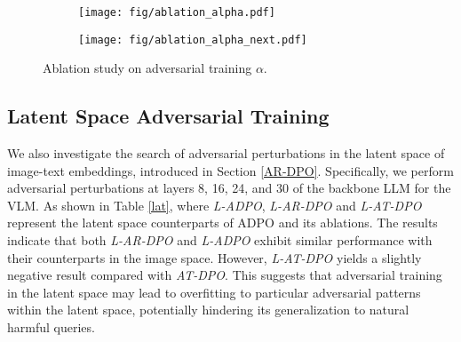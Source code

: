 \begin{figure}[ht]
\setlength{\abovecaptionskip}{0.cm}
    \centering
    \begin{subfigure}[b]{0.225\textwidth}
        \centering
        \texttt{[image: fig/ablation\_alpha.pdf]}
        \label{fig:sub1}
    \end{subfigure}
    \hfill
    \begin{subfigure}[b]{0.225\textwidth}
        \centering
        \texttt{[image: fig/ablation\_alpha\_next.pdf]}
        \label{fig:sub2}
    \end{subfigure}
\vspace{-1em}
    \caption{Ablation study on adversarial training $\alpha$.}
    \label{ablation study}
\vspace{-1em}
\end{figure}



\vspace{-.5em}
\subsection{Latent Space Adversarial Training}
\vspace{-.5em}

We also investigate the search of adversarial perturbations in the latent space of image-text embeddings, introduced in Section \ref{AR-DPO}. Specifically, we perform adversarial perturbations at layers 8, 16, 24, and 30 of the backbone LLM for the VLM.  As shown in Table \ref{lat}, where \textit{L-ADPO}, \textit{L-AR-DPO} and \textit{L-AT-DPO} represent the latent space counterparts of ADPO and its ablations. The results indicate that both \textit{L-AR-DPO} and \textit{L-ADPO} exhibit similar performance with their counterparts in the image space. However, \textit{L-AT-DPO} yields a slightly negative result compared with \textit{AT-DPO}. This suggests that adversarial training in the latent space may lead to overfitting to particular adversarial patterns within the latent space, potentially hindering its generalization to natural harmful queries.

